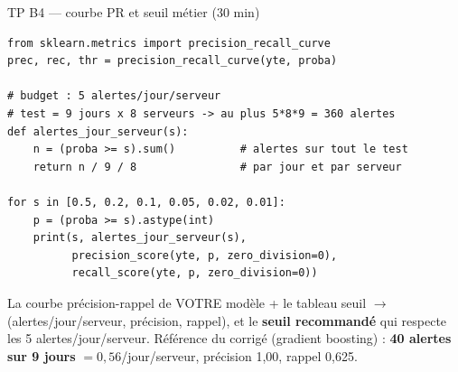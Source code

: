 \begin{frame}[fragile]{TP B4 --- courbe PR et seuil métier (30 min)}
\begin{codebox}
\begin{lstlisting}
from sklearn.metrics import precision_recall_curve
prec, rec, thr = precision_recall_curve(yte, proba)

# budget : 5 alertes/jour/serveur
# test = 9 jours x 8 serveurs -> au plus 5*8*9 = 360 alertes
def alertes_jour_serveur(s):
    n = (proba >= s).sum()          # alertes sur tout le test
    return n / 9 / 8                # par jour et par serveur

for s in [0.5, 0.2, 0.1, 0.05, 0.02, 0.01]:
    p = (proba >= s).astype(int)
    print(s, alertes_jour_serveur(s),
          precision_score(yte, p, zero_division=0),
          recall_score(yte, p, zero_division=0))
\end{lstlisting}
\end{codebox}
\begin{abox}[Livrable B4]
La courbe précision-rappel de VOTRE modèle + le tableau
seuil $\rightarrow$ (alertes/jour/serveur, précision, rappel), et le
\textbf{seuil recommandé} qui respecte les 5 alertes/jour/serveur.
Référence du corrigé (gradient boosting) : \textbf{40 alertes sur
9 jours} $= 0{,}56$/jour/serveur, précision 1,00, rappel 0,625.
\end{abox}
\end{frame}

